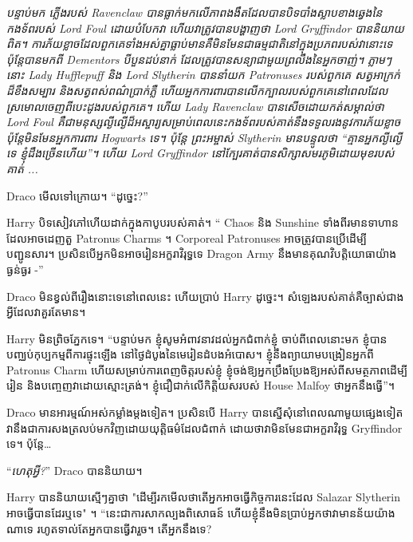 \emph{បន្ទាប់មក ភ្លើងរបស់ Ravenclaw បានធ្លាក់មកលើភាពងងឹតដែលបានបិទបាំងស្លាបខាងឆ្វេងនៃកងទ័ពរបស់ Lord Foul ដោយបំបែកវា ហើយវាត្រូវបានបង្ហាញថា Lord Gryffindor បាននិយាយពិត។ ការភ័យខ្លាចដែលពួកគេទាំងអស់គ្នាធ្លាប់មានគឺមិនមែនជាធម្មជាតិនៅក្នុងប្រភពរបស់វានោះទេ ប៉ុន្តែបានមកពី Dementors បីបួនដប់នាក់ ដែលត្រូវបានសន្យាជាមួយព្រលឹងនៃអ្នកចាញ់។ ភ្លាមៗនោះ Lady Hufflepuff និង Lord Slytherin បាននាំយក Patronuses របស់ពួកគេ សត្វអាក្រក់ដ៏ខឹងសម្បារ និងសត្វពស់ពណ៌ប្រាក់ភ្លឺ ហើយអ្នកការពារបានលើកក្បាលរបស់ពួកគេនៅពេលដែលស្រមោលចេញពីបេះដូងរបស់ពួកគេ។ ហើយ Lady Ravenclaw បានសើចដោយកត់សម្គាល់ថា Lord Foul គឺជាមនុស្សល្ងីល្ងើដ៏អស្ចារ្យសម្រាប់ពេលនេះកងទ័ពរបស់គាត់នឹងទទួលរងនូវការភ័យខ្លាចប៉ុន្តែមិនមែនអ្នកការពារ Hogwarts ទេ។ ប៉ុន្តែ ព្រះអម្ចាស់ Slytherin មាន​បន្ទូល​ថា “គ្មាន​អ្នក​ល្ងីល្ងើ​ទេ ខ្ញុំ​ដឹង​ច្រើន​ហើយ”។ ហើយ Lord Gryffindor នៅក្បែរគាត់បានសិក្សាសមរភូមិដោយមុខរបស់គាត់ ... }

Draco មើលទៅក្រោយ។ “ដូច្នេះ?”

Harry បិទសៀវភៅហើយដាក់ក្នុងកាបូបរបស់គាត់។ “ Chaos និង Sunshine ទាំងពីរមានទាហានដែលអាចដេញតួ Patronus Charms ។ Corporeal Patronuses អាចត្រូវបានប្រើដើម្បីបញ្ជូនសារ។ ប្រសិនបើអ្នកមិនអាចរៀនអក្ខរាវិរុទ្ធទេ Dragon Army នឹងមានគុណវិបត្តិយោធាយ៉ាងធ្ងន់ធ្ងរ -”

Draco មិន​ខ្វល់​ពី​រឿង​នោះ​ទេ​នៅ​ពេល​នេះ ហើយ​ប្រាប់ Harry ដូច្នេះ។ សំឡេងរបស់គាត់គឺច្បាស់ជាងអ្វីដែលវាគួរតែមាន។

Harry មិនព្រិចភ្នែកទេ។ “បន្ទាប់មក ខ្ញុំសូមអំពាវនាវដល់អ្នកជំពាក់ខ្ញុំ ចាប់ពីពេលនោះមក ខ្ញុំបានបញ្ឈប់កុប្បកម្មពីការផ្ទុះឡើង នៅថ្ងៃដំបូងនៃមេរៀនដំបងអំបោស។ ខ្ញុំនឹងព្យាយាមបង្រៀនអ្នកពី Patronus Charm ហើយសម្រាប់ការពេញចិត្តរបស់ខ្ញុំ ខ្ញុំចង់ឱ្យអ្នកប្រឹងប្រែងឱ្យអស់ពីសមត្ថភាពដើម្បីរៀន និងបញ្ចេញវាដោយស្មោះត្រង់។ ខ្ញុំជឿជាក់លើកិត្តិយសរបស់ House Malfoy ថាអ្នកនឹងធ្វើ”។

Draco មានអារម្មណ៍អស់កម្លាំងម្តងទៀត។ ប្រសិនបើ Harry បានស្នើសុំនៅពេលណាមួយផ្សេងទៀត វានឹងជាការសងត្រលប់មកវិញដោយយុត្តិធម៌ដែលជំពាក់ ដោយថាវាមិនមែនជាអក្ខរាវិរុទ្ធ Gryffindor ទេ។ ប៉ុន្តែ…

“\emph{ហេតុអ្វី?}” Draco បាននិយាយ។

Harry បាននិយាយស្មើៗគ្នាថា "ដើម្បីរកមើលថាតើអ្នកអាចធ្វើកិច្ចការនេះដែល Salazar Slytherin អាចធ្វើបានដែរឬទេ" ។ “នេះ​ជា​ការ​សាកល្បង​ពិសោធន៍ ហើយ​ខ្ញុំ​នឹង​មិន​ប្រាប់​អ្នក​ថា​វា​មាន​ន័យ​យ៉ាង​ណា​ទេ រហូត​ទាល់​តែ​អ្នក​បាន​ធ្វើ​វា​រួច។ តើអ្នកនឹងទេ?

